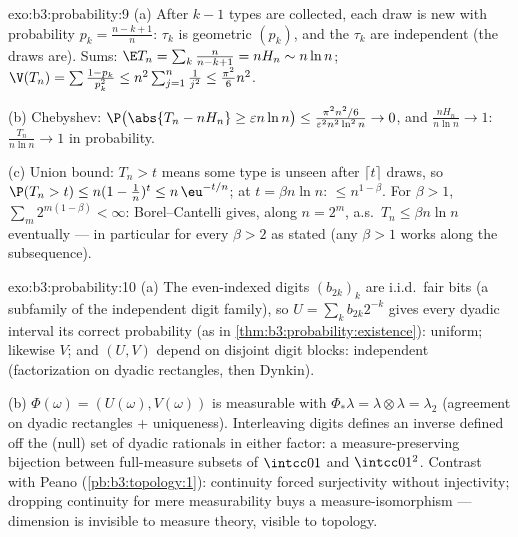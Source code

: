 \begin{solution}{exo:b3:probability:9}
(a) After $k - 1$ types are collected, each draw is new with
probability $p_k = \frac{n-k+1}n$: $\tau_k$ is geometric
$(p_k)$, and the $\tau_k$ are independent (the draws are).
Sums: $\E T_n = \sum_k\frac n{n-k+1} = nH_n \sim n\ln n$;
$\V(T_n) = \sum\frac{1 - p_k}{p_k^2} \leq
n^2\sum_{j=1}^n\frac1{j^2} \leq \frac{\pi^2}6n^2$.

(b) Chebyshev: $\P\bigl(\abs{T_n - nH_n} \geq \varepsilon
n\ln n\bigr) \leq \frac{\pi^2n^2/6}{\varepsilon^2n^2\ln^2n}
\to 0$, and $\frac{nH_n}{n\ln n} \to 1$: $\frac{T_n}{n\ln n}
\to 1$ in probability.

(c) Union bound: $T_n > t$ means some type is unseen after
$\lceil t\rceil$ draws, so $\P(T_n > t) \leq n(1 -
\frac1n)^{t} \leq n\,\eu^{-t/n}$; at $t = \beta n\ln n$:
$\leq n^{1 - \beta}$. For $\beta > 1$, $\sum_m
2^{m(1-\beta)} < \infty$: Borel--Cantelli gives, along $n =
2^m$, a.s.\ $T_n \leq \beta n\ln n$ eventually --- in
particular for every $\beta > 2$ as stated (any $\beta > 1$
works along the subsequence).
\end{solution}

\begin{solution}{exo:b3:probability:10}
(a) The even-indexed digits $(b_{2k})_k$ are i.i.d.\ fair
bits (a subfamily of the independent digit family), so $U =
\sum_kb_{2k}2^{-k}$ gives every dyadic interval its correct
probability (as in
\cref{thm:b3:probability:existence}): uniform; likewise $V$;
and $(U, V)$ depend on disjoint digit blocks: independent
(factorization on dyadic rectangles, then Dynkin).

(b) $\Phi(\omega) = (U(\omega), V(\omega))$ is measurable
with $\Phi_*\lambda = \lambda\otimes\lambda = \lambda_2$
(agreement on dyadic rectangles + uniqueness). Interleaving
digits defines an inverse defined off the (null) set of
dyadic rationals in either factor: a measure-preserving
bijection between full-measure subsets of $\intcc01$ and
$\intcc01^2$. Contrast with Peano
(\cref{pb:b3:topology:1}): continuity forced surjectivity
without injectivity; dropping continuity for mere
measurability buys a measure-isomorphism --- dimension is
invisible to measure theory, visible to topology.
\end{solution}

